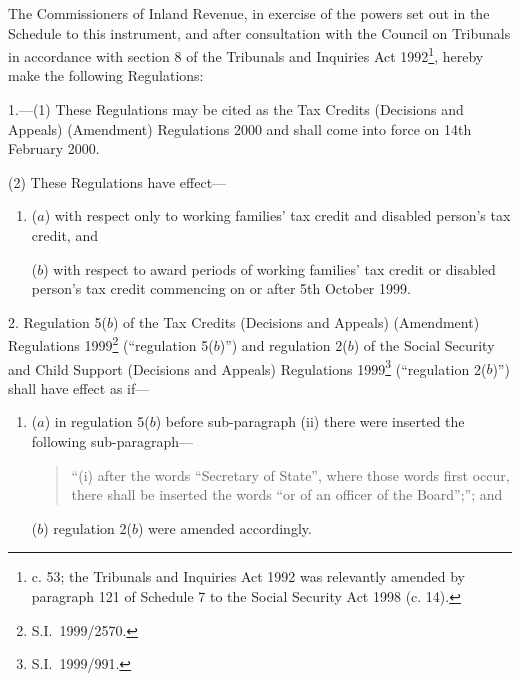\documentclass[12pt,a4paper]{article}
\title{\regstitle}
\author{S.I. 2000 No. 127}
\date{Made
21st January 2000\\
Laid before Parliament
24th January 2000\\
Coming into force
14th February 2000
}
\begin{document}
\maketitle


\medskip

\noindent
The Commissioners of Inland Revenue, in exercise of the powers set out in the Schedule to this instrument, and after consultation with the Council on Tribunals in accordance with section 8 of the Tribunals and Inquiries Act 1992\footnote{ c. 53; the Tribunals and Inquiries Act 1992 was relevantly amended by paragraph 121 of Schedule 7 to the Social Security Act 1998 (c. 14).}, hereby make the following Regulations: 

{\sloppy

\tableofcontents

}

\bigskip

\setcounter{secnumdepth}{-2}

1.---(1)  These Regulations may be cited as the Tax Credits (Decisions and Appeals) (Amendment) Regulations 2000 and shall come into force on 14th February 2000.

(2) These Regulations have effect—
\begin{enumerate}\item[]
($a$) with respect only to working families' tax credit and disabled person’s tax credit, and

($b$) with respect to award periods of working families' tax credit or disabled person’s tax credit commencing on or after 5th October 1999.
\end{enumerate}

\medskip

2.  Regulation 5($b$)  of the Tax Credits (Decisions and Appeals) (Amendment) Regulations 1999\footnote{S.I.\ 1999/2570.} (“regulation 5($b$)”) and regulation 2($b$)  of the Social Security and Child Support (Decisions and Appeals) Regulations 1999\footnote{S.I.\ 1999/991.} (“regulation 2($b$)”) shall have effect as if—
\begin{enumerate}\item[]
($a$) in regulation 5($b$)  before sub-paragraph (ii) there were inserted the following sub-paragraph—
\begin{quotation}
“(i) after the words “Secretary of State”, where those words first occur, there shall be inserted the words “or of an officer of the Board”;”; and
\end{quotation}

($b$) regulation 2($b$)  were amended accordingly.
\end{enumerate}
\end{document}
